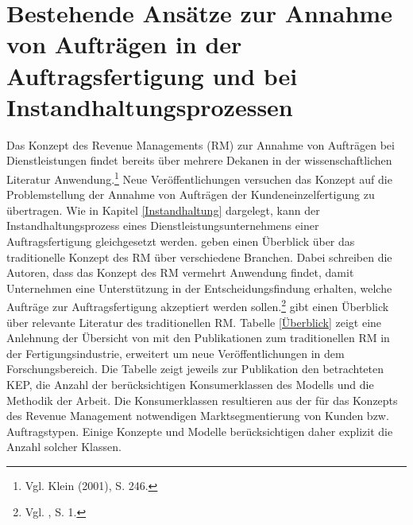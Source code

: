 \chapter{Bestehende Ansätze zur Annahme von Aufträgen in der Auftragsfertigung und bei Instandhaltungsprozessen}\label{Review}
\setcounter{footnote}{54}  %

Das Konzept des Revenue Managements (RM) zur Annahme von Aufträgen bei Dienstleistungen findet bereits über mehrere Dekanen in der wissenschaftlichen Literatur Anwendung.\footnote{Vgl. Klein (2001), S. 246.} Neue Veröffentlichungen versuchen das Konzept auf die Problemstellung der Annahme von Aufträgen der Kundeneinzelfertigung zu übertragen. Wie in Kapitel \ref{Instandhaltung} dargelegt, kann der Instandhaltungsprozess eines Dienstleistungsunternehmens einer Auftragsfertigung gleichgesetzt werden. \cite{kimms2005revenue} geben einen Überblick über das traditionelle Konzept des RM über verschiedene Branchen. Dabei schreiben die Autoren, dass das Konzept des RM vermehrt Anwendung findet, damit Unternehmen eine Unterstützung in der Entscheidungsfindung erhalten, welche Aufträge zur Auftragsfertigung akzeptiert werden sollen.\footnote{Vgl. \cite{kimms2005revenue}, S. 1.} \cite{quante2009management} gibt einen Überblick über relevante Literatur des traditionellen RM. Tabelle \ref{Überblick} zeigt eine Anlehnung der Übersicht von \cite{quante2009management} mit den Publikationen zum traditionellen RM in der Fertigungsindustrie, erweitert um neue Veröffentlichungen in dem Forschungsbereich. Die Tabelle zeigt jeweils zur Publikation den betrachteten KEP, die Anzahl der berücksichtigen Konsumerklassen des Modells und die Methodik der Arbeit. Die Konsumerklassen resultieren aus der für das Konzepts des Revenue Management notwendigen Marktsegmentierung von Kunden bzw. Auftragstypen. Einige Konzepte und Modelle berücksichtigen daher explizit die Anzahl solcher Klassen.


